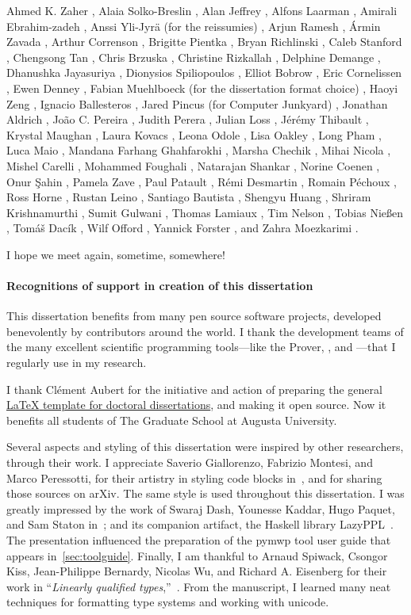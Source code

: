 Ahmed K. Zaher%
, Alaia Solko-Breslin%
, Alan Jeffrey%
, Alfons Laarman%
, Amirali Ebrahim\hyp{}zadeh%
, Anssi Yli-Jyrä (for the reissumies)%
, Arjun Ramesh%
, Ármin Zavada%
, Arthur Correnson%
, Brigitte Pientka%
, Bryan Richlinski%
, Caleb Stanford%
, Chengsong Tan%
, Chris Brzuska%
, Christine Rizkallah%
, Delphine Demange%
, Dhanushka Jayasuriya%
, Dionysios Spiliopoulos%
, Elliot Bobrow%
, Eric Cornelissen%
, Ewen Denney%
, Fabian Muehlboeck (for the dissertation format choice)%
, Haoyi Zeng%
, Ignacio Ballesteros%
, Jared Pincus (for Computer Junkyard)%
, Jonathan Aldrich%
, João C. Pereira%
, Judith Perera%
, Julian Loss%
, Jérémy Thibault%
, Krystal Maughan%
, Laura Kovacs%
, Leona Odole%
, Lisa Oakley%
, Long Pham%
, Luca Maio%
, Mandana Farhang Ghahfarokhi%
, Marsha Chechik%
, Mihai Nicola%
, Mishel Carelli%
, Mohammed Foughali%
, Natarajan Shankar%
, Norine Coenen%
, Onur Şahin%
, Pamela Zave%
, Paul Patault%
, Rémi Desmartin%
, Romain Péchoux%
, Ross Horne%
, Rustan Leino%
, Santiago Bautista%
, Shengyu Huang%
, Shriram Krishnamurthi%
, Sumit Gulwani%
, Thomas Lamiaux%
, Tim Nelson%
, Tobias Nießen%
, Tomáš Dacík%
, Wilf Offord%
, Yannick Forster%
, and Zahra Moezkarimi%
.

I hope we meet again, sometime, somewhere!

\paragraph*{Recognitions of support in creation of this dissertation}
This dissertation benefits from many pen source software projects, developed benevolently by contributors around the world.
I thank the development teams of the many excellent scientific programming tools---like the  Prover, , and ---that I regularly use in my research.

I thank Clément Aubert for the initiative and action of preparing the general \href{https://github.com/the-au-forml-lab/au_ccs_dissertation_template}{\LaTeX{ }template for doctoral dissertations},
and making it open source.
Now it benefits all students of The Graduate School at Augusta University.

Several aspects and styling of this dissertation were inspired by other researchers, through their work.
I appreciate Saverio Giallorenzo, Fabrizio Montesi, and Marco Peressotti, for their artistry in styling code blocks in~\cite{giallorenzo2024}, and for sharing those sources on arXiv.
The same style is used throughout this dissertation.
I was greatly impressed by the work of Swaraj Dash, Younesse Kaddar, Hugo Paquet, and Sam Staton in~\cite{dash2023};
and its companion artifact, the Haskell library LazyPPL~\cite{dash2023b}.
The presentation influenced the preparation of the pymwp tool user guide that appears in~\autoref{sec:toolguide}.
Finally, I am thankful to Arnaud Spiwack, Csongor Kiss, Jean-Philippe Bernardy, Nicolas Wu, and Richard A. Eisenberg
for their work in \enquote{\textit{Linearly qualified types},}~\cite{spiwack2022}.
From the manuscript, I learned many neat techniques for formatting type systems and working with unicode.

